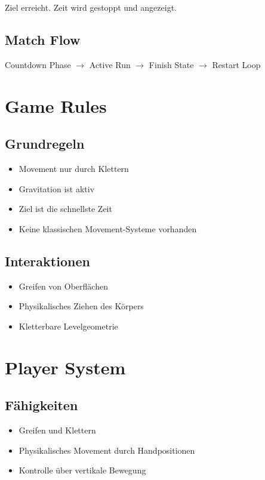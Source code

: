 \documentclass[11pt,a4paper]{article}
\begin{document}
Ziel erreicht. Zeit wird gestoppt und angezeigt.

\subsection{Match Flow}

Countdown Phase $\rightarrow$ Active Run $\rightarrow$ Finish State $\rightarrow$ Restart Loop

\section{Game Rules}

\subsection{Grundregeln}

\begin{itemize}
    \item Movement nur durch Klettern
    \item Gravitation ist aktiv
    \item Ziel ist die schnellste Zeit
    \item Keine klassischen Movement-Systeme vorhanden
\end{itemize}

\subsection{Interaktionen}

\begin{itemize}
    \item Greifen von Oberflächen
    \item Physikalisches Ziehen des Körpers
    \item Kletterbare Levelgeometrie
\end{itemize}

\section{Player System}

\subsection{Fähigkeiten}

\begin{itemize}
    \item Greifen und Klettern
    \item Physikalisches Movement durch Handpositionen
    \item Kontrolle über vertikale Bewegung
\end{itemize}
\end{document}
